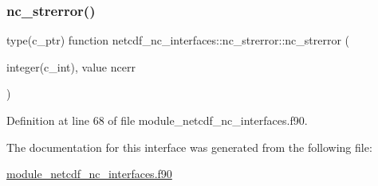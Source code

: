 \subsubsection{\texorpdfstring{nc\+\_\+strerror()}{nc\_strerror()}}
{\footnotesize\ttfamily type(c\+\_\+ptr) function netcdf\+\_\+nc\+\_\+interfaces\+::nc\+\_\+strerror\+::nc\+\_\+strerror (\begin{DoxyParamCaption}\item[{integer(c\+\_\+int), value}]{ncerr }\end{DoxyParamCaption})}



Definition at line 68 of file module\+\_\+netcdf\+\_\+nc\+\_\+interfaces.\+f90.



The documentation for this interface was generated from the following file\+:\begin{DoxyCompactItemize}
\item 
\hyperlink{module__netcdf__nc__interfaces_8f90}{module\+\_\+netcdf\+\_\+nc\+\_\+interfaces.\+f90}\end{DoxyCompactItemize}
